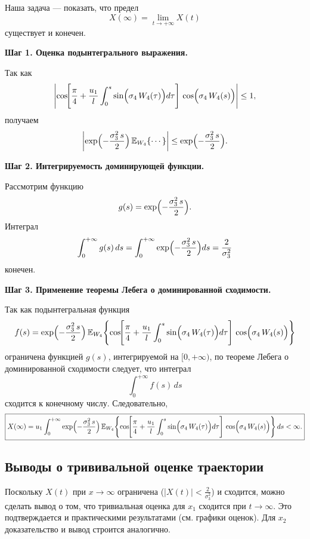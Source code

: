 \documentclass[12pt]{article}
\begin{document}
Наша задача --- показать, что предел
\[
	X(\infty)=\lim_{t\to+\infty}X(t)
\]
существует и конечен.

\textbf{Шаг 1. Оценка подынтегрального выражения.}

Так как
\[
	\left|\cos\!\Biggl[\frac{\pi}{4}+\frac{u_1}{l}\int_{0}^{s}\sin\Bigl(\sigma_4\,W_4(\tau)\Bigr)d\tau\Biggr]
	\,\cos\Bigl(\sigma_4\,W_4(s)\Bigr)\right| \le 1,
\]
получаем
\[
	\left|\exp\Bigl(-\frac{\sigma_3^2\,s}{2}\Bigr)
	\,\mathbb{E}_{W_4}\!\left\{\cdots\right\}\right|\le \exp\Bigl(-\frac{\sigma_3^2\,s}{2}\Bigr).
\]

\textbf{Шаг 2. Интегрируемость доминирующей функции.}

Рассмотрим функцию
\[
	g(s)=\exp\Bigl(-\frac{\sigma_3^2\, s}{2}\Bigr).
\]
Интеграл
\[
	\int_{0}^{+\infty}g(s)\,ds=\int_{0}^{+\infty}\exp\Bigl(-\frac{\sigma_3^2\, s}{2}\Bigr)ds = \frac{2}{\sigma_3^2}
\]
конечен.

\textbf{Шаг 3. Применение теоремы Лебега о доминированной сходимости.}

Так как подынтегральная функция
\[
	f(s)=\exp\Bigl(-\frac{\sigma_3^2\, s}{2}\Bigr)\,
	\mathbb{E}_{W_4}\!\left\{\cos\!\Biggl[\frac{\pi}{4}+\frac{u_1}{l}\int_{0}^{s}\sin\Bigl(\sigma_4\,W_4(\tau)\Bigr)d\tau\Biggr]\,\cos\Bigl(\sigma_4\,W_4(s)\Bigr)\right\}
\]
ограничена функцией $g(s)$, интегрируемой на $[0,+\infty)$, по теореме Лебега о доминированной сходимости следует, что интеграл
\[
	\int_{0}^{+\infty}f(s)\,ds
\]
сходится к конечному числу. Следовательно,
\[
	\boxed{X(\infty)= u_1\int_{0}^{+\infty}\exp\Bigl(-\frac{\sigma_3^2\, s}{2}\Bigr)\,
		\mathbb{E}_{W_4}\!\left\{\cos\!\Biggl[\frac{\pi}{4}+\frac{u_1}{l}\int_{0}^{s}\sin\Bigl(\sigma_4\,W_4(\tau)\Bigr)d\tau\Biggr]\,\cos\Bigl(\sigma_4\,W_4(s)\Bigr)\right\}ds < \infty.}
\]

\subsection{Выводы о трививальной оценке траектории}

Поскольку $X(t)$ при $x \to \infty$ ограничена (|$X(t)| < \frac{2}{\sigma_3^2}$) и сходится, можно сделать вывод о том, что тривиальная оценка для $x_1$ сходится при $t \to \infty$. Это подтверждается и практическими результатами (см. графики оценок). Для $x_2$ доказательство и вывод строится аналогично.
\end{document}
